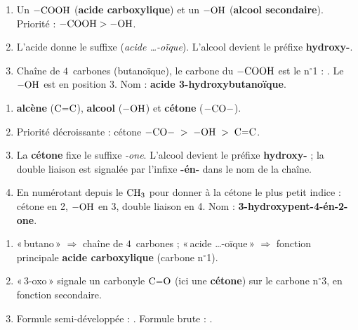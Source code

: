 \documentclass[11pt,a4paper]{article}
\begin{document}
\begin{corrige}
\begin{enumerate}[label=\alph*)]
  \item Un $-\ce{COOH}$ (\textbf{acide carboxylique}) et un $-\ce{OH}$ (\textbf{alcool secondaire}). Priorité : $-\ce{COOH} > -\ce{OH}$.
  \item L'acide donne le suffixe (\textit{acide \dots-oïque}). L'alcool devient le préfixe \textbf{hydroxy-}.
  \item Chaîne de $4$~carbones (butanoïque), le carbone du $-\ce{COOH}$ est le n$^\circ$1 : . Le $-\ce{OH}$ est en position 3. Nom : \textbf{acide 3-hydroxybutanoïque}.
\end{enumerate}
\end{corrige}

\begin{corrige}
\begin{enumerate}[label=\alph*)]
  \item \textbf{alcène} ($\ce{C=C}$), \textbf{alcool} ($-\ce{OH}$) et \textbf{cétone} ($-\ce{CO}-$).
  \item Priorité décroissante : cétone $-\ce{CO}- \;>\; -\ce{OH} \;>\; \ce{C=C}$.
  \item La \textbf{cétone} fixe le suffixe \textit{-one}. L'alcool devient le préfixe \textbf{hydroxy-} ; la double liaison est signalée par l'infixe \textbf{-én-} dans le nom de la chaîne.
  \item En numérotant depuis le $\ce{CH3}$ pour donner à la cétone le plus petit indice : cétone en 2, $-\ce{OH}$ en 3, double liaison en 4. Nom : \textbf{3-hydroxypent-4-én-2-one}.
\end{enumerate}
\end{corrige}

\begin{corrige}
\begin{enumerate}[label=\alph*)]
  \item «\,butano\,» $\Rightarrow$ chaîne de $4$~carbones ; «\,acide \dots-oïque\,» $\Rightarrow$ fonction principale \textbf{acide carboxylique} (carbone n$^\circ$1).
  \item «\,3-oxo\,» signale un carbonyle $\ce{C=O}$ (ici une \textbf{cétone}) sur le carbone n$^\circ$3, en fonction secondaire.
  \item Formule semi-développée : . Formule brute : .
\end{enumerate}
\end{corrige}
\end{document}
